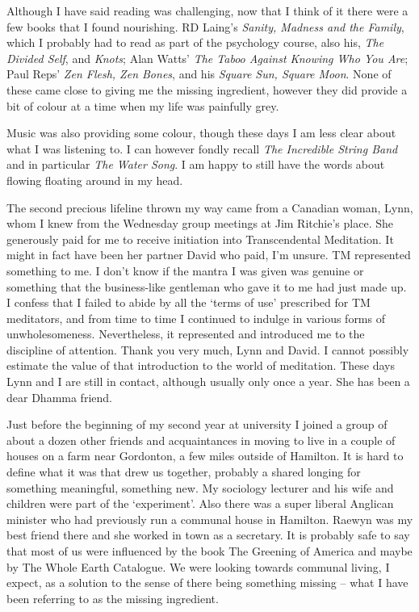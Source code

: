 Although I have said reading was challenging, now that I think of it
there were a few books that I found nourishing. RD Laing's \emph{Sanity,
Madness and the Family}, which I probably had to read as part of the
psychology course, also his, \emph{The Divided Self}, and \emph{Knots};
Alan Watts' \emph{The Taboo Against Knowing Who You Are}; Paul Reps'
\emph{Zen Flesh, Zen Bones}, and his \emph{Square Sun, Square Moon}.
None of these came close to giving me the missing ingredient, however
they did provide a bit of colour at a time when my life was painfully
grey.

Music was also providing some colour, though these days I am less clear about
what I was listening to. I can however fondly recall \emph{The Incredible String
  Band} and in particular \emph{The Water Song}. I am happy to still have the
words about flowing floating around in my head.

The second precious lifeline thrown my way came from a Canadian woman,
Lynn, whom I knew from the Wednesday group meetings at Jim Ritchie's
place. She generously paid for me to receive initiation into
Transcendental Meditation. It might in fact have been her partner David
who paid, I'm unsure. TM represented something to me. I don't know if
the mantra I was given was genuine or something that the business-like
gentleman who gave it to me had just made up. I confess that I failed to
abide by all the `terms of use' prescribed for TM meditators, and from
time to time I continued to indulge in various forms of unwholesomeness.
Nevertheless, it represented and introduced me to the discipline of
attention. Thank you very much, Lynn and David.
I cannot possibly estimate the value of that introduction to the world of meditation.
These days Lynn and I are still in
contact, although usually only once a year. She has been a dear Dhamma
friend.

Just before the beginning of my second year at university I joined a
group of about a dozen other friends and acquaintances in moving to live
in a couple of houses on a farm near Gordonton, a few miles outside of
Hamilton. It is hard to define what it was that drew us together,
probably a shared longing for something meaningful, something new. My
sociology lecturer and his wife and children were part of the
`experiment'. Also there was a super liberal Anglican minister who had
previously run a communal house in Hamilton. Raewyn was my best friend
there and she worked in town as a secretary. It is probably safe to say
that most of us were influenced by the book The Greening of America\cite{greening}
and maybe by The Whole Earth Catalogue\cite{earth}.
We were looking towards communal living, I expect, as a solution to the sense of there being something
missing -- what I have been referring to as the missing ingredient.

